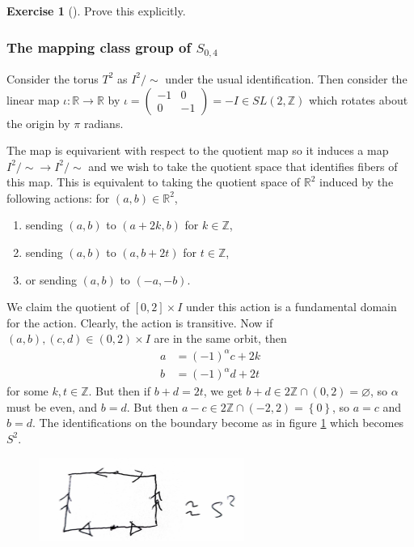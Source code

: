 \documentclass[reqno]{amsart}
\theoremstyle{definition}
\newtheorem{exercise}[theorem]{Exercise}
\theoremstyle{remark}
\begin{document}
\begin{exercise}[]
    Prove this explicitly.
\end{exercise}

\subsubsection*{The mapping class group of
$S_{0,4}$}

Consider the torus $T^2$ as $I^2 / \sim$ under the usual
identification. Then consider the
linear map $\iota \colon \mathbb{R} \to \mathbb{R}$ 
by
$\iota = \begin{pmatrix} -1 & 0\\ 0 & -1 \end{pmatrix} 
= - I
\in SL(2, \mathbb{Z})$ which rotates about the origin
by $\pi$ radians.

The map is equivarient with respect to the quotient map
so it induces a map $I^2 / \sim \to I^2 / \sim$
and we wish to take the quotient space that identifies
fibers of this map. This is equivalent to taking
the quotient space of $\mathbb{R}^2$ induced by the
following actions: for $\left( a,b \right) \in \mathbb{R}^2$,
\begin{enumerate}
    \item sending $(a,b)$ to $(a+2k,b)$ for $k \in \mathbb{Z}$,
    \item sending $(a,b)$ to $(a, b+ 2t)$ for $t \in \mathbb{Z}$,
    \item or sending $(a,b)$ to $(-a, -b)$.
\end{enumerate}
We claim the quotient of $\left[ 0,2 \right] \times I $ 
under this action
is a fundamental domain for the action.
Clearly, the action is transitive. Now
if $(a,b),(c,d) \in (0,2) \times I $ are in the same orbit,
then
\begin{align*}
    a &= (-1)^{\alpha} c + 2k \\
    b &= (-1)^{\alpha} d + 2t
\end{align*}
for some $k,t \in \mathbb{Z}$. But then
if $b+d = 2t$, we  get $b+d \in 2 \mathbb{Z} \cap \left( 0,2 \right) 
= \varnothing$, so $\alpha$ must be even, and
$b = d$. But then
$a-c \in  2\mathbb{Z} \cap \left( -2, 2 \right) =
\left\{ 0 \right\} $, so $a=c$ and $b=d$.
The identifications on the boundary become as in figure
\ref{fig:involution-on-torus-quotient} which becomes
$S^2$.


\begin{figure}[htpb]
    \centering
    \includegraphics[width=0.6\textwidth]{involution-on-torus-quotient.jpg}
    \caption{}
    \label{fig:involution-on-torus-quotient}
\end{figure}
\end{document}

